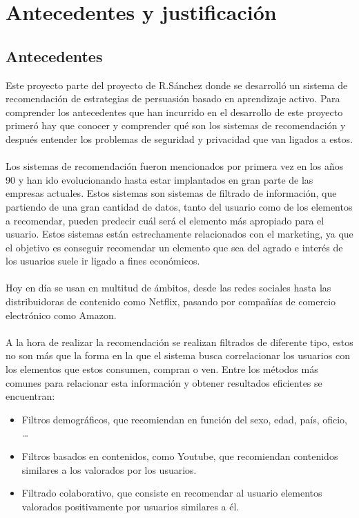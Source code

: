 \chapter{Antecedentes y justificación}
\thispagestyle{fancy}

\section{Antecedentes}
Este proyecto parte del proyecto de R.Sánchez\autocite{sanchez-corcueraPersuasionbasedRecommenderSystem2020} donde se desarrolló un sistema de recomendación de estrategias de persuasión basado en aprendizaje activo. Para comprender los antecedentes que han incurrido en el desarrollo de este proyecto primeró hay que conocer y comprender qué son los sistemas de recomendación y después entender los problemas de seguridad y privacidad que van ligados a estos. 
\\ \\
Los sistemas de recomendación fueron mencionados por primera vez en los años 90 y han ido evolucionando hasta estar implantados en gran parte de las empresas actuales. Estos sistemas son sistemas de filtrado de información, que partiendo de una gran cantidad de datos, tanto del usuario como de los elementos a recomendar, pueden predecir cuál será el elemento más apropiado para el usuario. Estos sistemas están estrechamente relacionados con el marketing, ya que el objetivo es conseguir recomendar un elemento que sea del agrado e interés de los usuarios suele ir ligado a fines económicos.
\\ \\
Hoy en día se usan en multitud de ámbitos, desde las redes sociales hasta las distribuidoras de contenido como Netflix, pasando por compañías de comercio electrónico como Amazon. 
\\ \\
A la hora de realizar la recomendación se realizan filtrados de diferente tipo, estos no son más que la forma en la que el sistema busca correlacionar los usuarios con los elementos que estos consumen, compran o ven. Entre los métodos más comunes para relacionar esta información y obtener resultados eficientes se encuentran:
\begin{itemize}
    \item Filtros demográficos, que recomiendan en función del sexo, edad, país, oficio, … 
    \item Filtros basados en contenidos, como Youtube, que recomiendan contenidos similares a los valorados por los usuarios. 
    \item Filtrado colaborativo, que consiste en recomendar al usuario elementos valorados positivamente por usuarios similares a él. 
\end{itemize}

